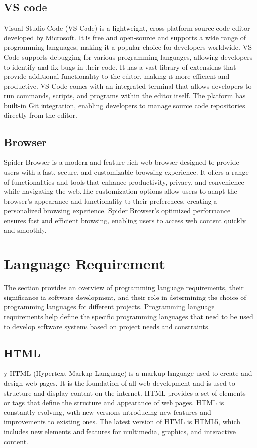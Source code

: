 \subsection{VS code}
Visual Studio Code (VS Code) is a lightweight, cross-platform source code editor developed by Microsoft. It is free and open-source and supports a wide range of programming languages, making it a popular choice for developers worldwide. VS Code supports debugging for various programming languages, allowing developers to identify and fix bugs in their code. It has a vast library of extensions that provide additional functionality to the editor, making it more efficient and productive. VS Code comes with an integrated terminal that allows developers to run commands, scripts, and programs within the editor itself. The platform has built-in Git integration, enabling developers to manage source code repositories directly from the editor.
\subsection{Browser} 
Spider Browser is a modern and feature-rich web browser designed to provide users with a fast, secure, and customizable browsing experience. It offers a range of functionalities and tools that enhance productivity, privacy, and convenience while navigating the web.The customization options allow users to adapt the browser's appearance and functionality to their preferences, creating a personalized browsing experience. Spider Browser's optimized performance ensures fast and efficient browsing, enabling users to access web content quickly and smoothly.


\section{Language Requirement}
The section provides an overview of programming language requirements, their significance in software development, and their role in determining the choice of programming languages for different projects. Programming language requirements help define the specific programming languages that need to be used to develop software systems based on project needs and constraints.

\subsection{HTML}y
HTML (Hypertext Markup Language) is a markup language used to create and design web pages. It is the foundation of all web development and is used to structure and display content on the internet. HTML provides a set of elements or tags that define the structure and appearance of web pages. HTML is constantly evolving, with new versions introducing new features and improvements to existing ones. The latest version of HTML is HTML5, which includes new elements and features for multimedia, graphics, and interactive content.

